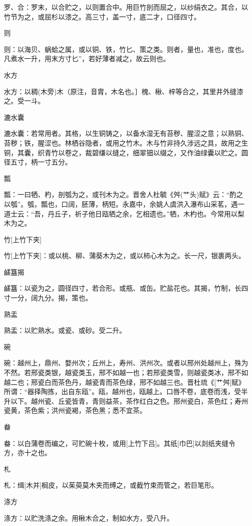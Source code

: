\documentclass[12pt,UTF8]{ctexbook}
\begin{document}
罗、合：罗末，以合贮之，以则置合中。用巨竹剖而屈之，以纱绢衣之。其合，以竹节为之，或屈杉以漆之。高三寸，盖一寸，底二才，口径四寸。

则

则：以海贝、蜗蛤之属，或以铜、铁，竹匕、策之类。则者，量也，准也，度也。凡煮水一升，用末方寸匕”，若好薄者减之，故云则也。

水方

水方：以稠(木旁)木（原注，音胄，木名也。］槐、楸、梓等合之，其里井外缝漆之。受一斗。

漉水囊

漉水囊：若常用者。其格，以生铜铸之，以备水湿无有苔秽、腥涩之意；以熟铜、苔秽；铁，腥涩也。林栖谷隐者，或用之竹木。木与竹非持久涉远之具，故用之生铜，其囊，织青竹以卷之，裁碧缣以缝之，细翠钿以缀之，又作油绿囊以贮之。圆径五寸，柄一寸五分。

瓢

瓢：一曰牺、杓，剖瓠为之，或刊木为之。晋舍人杜毓《舛(艹头)赋》云：“酌之以瓠”。瓠，瓢也，口阔，胚薄，柄短。永嘉中，余姚人虞洪入瀑布山采茗，遇一道士云：“吾，丹丘子，祈子他日瓯牺之余，乞相遗也。”牺，木杓也。今常用以梨木为之。

竹[上竹下夹]

竹[上竹下夹]：或以桃、柳、蒲葵木为之，或以柿心木为之。长一尺，银裹两头。

鹾簋揭

鹾簋：以瓷为之，圆径四寸，若合形。或瓶、或缶。贮盐花也。其揭，竹制，长四寸一分，阔九分。揭，策也。

熟盂

熟盂：以贮熟水。或瓷、或砂。受二升。

碗

碗：越州上，鼎州、婺州次；丘州上，寿州、洪州次。或者以邢州处越州上，殊为不然。若邢瓷类银，越瓷类玉，邢不如越一也；若邢瓷类雪，则越瓷类冰，邢不如越二也；邢瓷白而茶色丹，越瓷青而茶色绿，邢不如越三也。晋杜琉《[艹舛]赋》所谓：“器择陶拣，出自东瓯”。瓯，越州也，瓯越上。口唇不卷，底卷而浅，受半升以下。越州瓷、丘瓷皆青，青则益茶，茶作红白之色。邢州瓷白，茶色红；寿州瓷黄，茶色紫；洪州瓷褐，茶色黑；悉不宜茶。

畚

畚：以白蒲卷而编之，可贮碗十枚，或用[上竹下吕]。其纸[巾巴]以剡纸夹缝令方，亦十之也。

札

札：缉[木并]榈皮，以茱萸莫木夹而缚之，或截竹束而管之，若巨笔形。

涤方

涤方：以贮洗涤之余。用楸木合之，制如水方，受八升。
\end{document}

